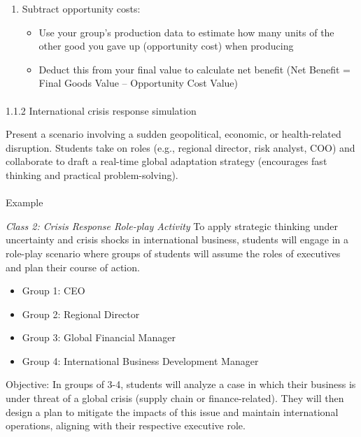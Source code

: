 \documentclass[
  11pt,
]{article}
\makeatletter
\let\oldparagraph\paragraph
\renewcommand{\paragraph}{
    \@ifstar
      \xxxParagraphStar
      \xxxParagraphNoStar
  }
\newcommand{\xxxParagraphStar}[1]{\oldparagraph*{#1}\mbox{}}
\newcommand{\xxxParagraphNoStar}[1]{\oldparagraph{#1}\mbox{}}
\providecommand{\tightlist}{%
  \setlength{\itemsep}{0pt}\setlength{\parskip}{0pt}}
\makeatother
\begin{document}
\begin{enumerate}
\def\labelenumi{\arabic{enumi}.}
\setcounter{enumi}{2}
\tightlist
\item
  Subtract opportunity costs:

  \begin{itemize}
  \tightlist
  \item
    Use your group's production data to estimate how many units of the
    other good you gave up (opportunity cost) when producing
  \item
    Deduct this from your final value to calculate net benefit (Net
    Benefit = Final Goods Value -- Opportunity Cost Value)
  \end{itemize}
\end{enumerate}

\paragraph{1.1.2 International crisis response
simulation}\label{international-crisis-response-simulation-1}

Present a scenario involving a sudden geopolitical, economic, or
health-related disruption. Students take on roles (e.g., regional
director, risk analyst, COO) and collaborate to draft a real-time global
adaptation strategy (encourages fast thinking and practical
problem-solving).

\paragraph{Example}\label{example-1}

\emph{Class 2: Crisis Response Role-play Activity} To apply strategic
thinking under uncertainty and crisis shocks in international business,
students will engage in a role-play scenario where groups of students
will assume the roles of executives and plan their course of action.

\begin{itemize}
\tightlist
\item
  Group 1: CEO
\item
  Group 2: Regional Director
\item
  Group 3: Global Financial Manager
\item
  Group 4: International Business Development Manager
\end{itemize}

Objective: In groups of 3-4, students will analyze a case in which their
business is under threat of a global crisis (supply chain or
finance-related). They will then design a plan to mitigate the impacts
of this issue and maintain international operations, aligning with their
respective executive role.
\end{document}
